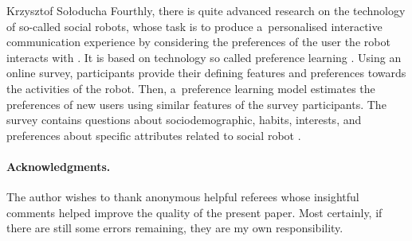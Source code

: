 \begin{artengenv}{Krzysztof Sołoducha}
Fourthly, there is quite advanced research on the technology of so-called social robots, whose task is to produce a~personalised interactive communication experience by considering the preferences of the user the robot interacts with
\parencite[][]{maroto-gomez_adaptive_2022}. %
 It is based on technology so called preference learning 
\parencite[][]{furnkranz_preference_2011}. %
 Using an online survey, participants provide their defining features and preferences towards the activities of the robot. Then, a~preference learning model estimates the preferences of new users using similar features of the survey participants. The survey contains questions about sociodemographic, habits, interests, and preferences about specific attributes related to social robot 
\parencite[][p.2]{furnkranz_preference_2011}.%


\paragraph{Acknowledgments.}
The author wishes to thank anonymous helpful referees whose insightful comments helped improve the quality of the present paper. Most certainly, if there are still some errors remaining, they are my own responsibility.



\end{artengenv}

